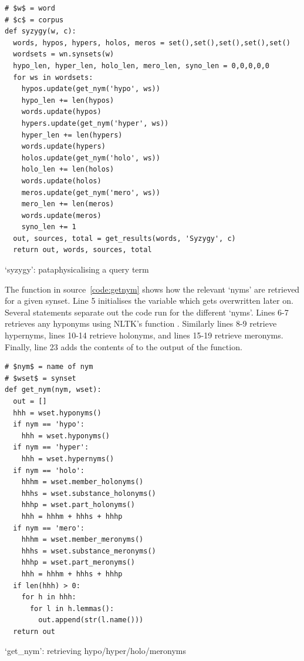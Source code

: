\begin{listing}[!htbp] %
  \begin{verbatim}
# $w$ = word
# $c$ = corpus
def syzygy(w, c):
  words, hypos, hypers, holos, meros = set(),set(),set(),set(),set()
  wordsets = wn.synsets(w)
  hypo_len, hyper_len, holo_len, mero_len, syno_len = 0,0,0,0,0
  for ws in wordsets:
    hypos.update(get_nym('hypo', ws))
    hypo_len += len(hypos)
    words.update(hypos)
    hypers.update(get_nym('hyper', ws))
    hyper_len += len(hypers)
    words.update(hypers)
    holos.update(get_nym('holo', ws))
    holo_len += len(holos)
    words.update(holos)
    meros.update(get_nym('mero', ws))
    mero_len += len(meros)
    words.update(meros)
    syno_len += 1
  out, sources, total = get_results(words, 'Syzygy', c)
  return out, words, sources, total
  \end{verbatim}
\caption[`syzygy' function]{`syzygy': pataphysicalising a query term}
\label{code:syzygy}
\end{listing}

The  function in source~\ref{code:getnym} shows how the relevant `nyms' are retrieved for a given synset. Line 5 initialises the variable  which gets overwritten later on. Several  statements separate out the code run for the different `nyms'. Lines 6-7 retrieves any hyponyms using \ac{NLTK}'s  function . Similarly lines 8-9 retrieve hypernyms, lines 10-14 retrieve holonyms, and lines 15-19 retrieve meronyms. Finally, line 23 adds the contents of  to the output of the function.

\begin{listing}[!htbp] %
  \begin{verbatim}
# $nym$ = name of nym
# $wset$ = synset
def get_nym(nym, wset):
  out = []
  hhh = wset.hyponyms()
  if nym == 'hypo':
    hhh = wset.hyponyms()
  if nym == 'hyper':
    hhh = wset.hypernyms()
  if nym == 'holo':
    hhhm = wset.member_holonyms()
    hhhs = wset.substance_holonyms()
    hhhp = wset.part_holonyms()
    hhh = hhhm + hhhs + hhhp
  if nym == 'mero':
    hhhm = wset.member_meronyms()
    hhhs = wset.substance_meronyms()
    hhhp = wset.part_meronyms()
    hhh = hhhm + hhhs + hhhp
  if len(hhh) > 0:
    for h in hhh:
      for l in h.lemmas():
        out.append(str(l.name()))
  return out
  \end{verbatim}
\caption[`get\_nym' function]{`get\_nym': retrieving hypo/hyper/holo/meronyms}
\label{code:getnym}
\end{listing}

